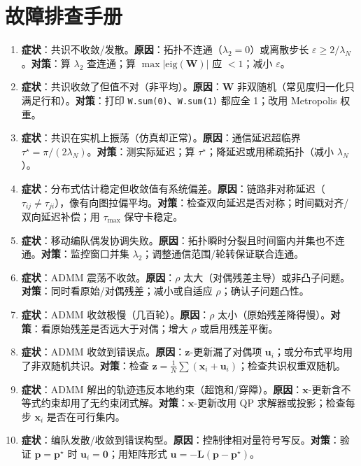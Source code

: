 \section*{故障排查手册}
\begin{enumerate}
  \item \textbf{症状}：共识不收敛/发散。\textbf{原因}：拓扑不连通（$\lambda_2=0$）或离散步长 $\varepsilon\ge2/\lambda_N$。\textbf{对策}：算 $\lambda_2$ 查连通；算 $\max|\mathrm{eig}(\mathbf{W})|$ 应 $<1$；减小 $\varepsilon$。
  \item \textbf{症状}：共识收敛了但值不对（非平均）。\textbf{原因}：$\mathbf{W}$ 非双随机（常见度归一化只满足行和）。\textbf{对策}：打印 \verb|W.sum(0)|、\verb|W.sum(1)| 都应全 1；改用 Metropolis 权重。
  \item \textbf{症状}：共识在实机上振荡（仿真却正常）。\textbf{原因}：通信延迟超临界 $\tau^\star=\pi/(2\lambda_N)$。\textbf{对策}：测实际延迟；算 $\tau^\star$；降延迟或用稀疏拓扑（减小 $\lambda_N$）。
  \item \textbf{症状}：分布式估计稳定但收敛值有系统偏差。\textbf{原因}：链路非对称延迟（$\tau_{ij}\ne\tau_{ji}$），像有向图拉偏平均。\textbf{对策}：检查双向延迟是否对称；时间戳对齐/双向延迟补偿；用 $\tau_{\max}$ 保守卡稳定。
  \item \textbf{症状}：移动编队偶发协调失败。\textbf{原因}：拓扑瞬时分裂且时间窗内并集也不连通。\textbf{对策}：监控窗口并集 $\lambda_2$；调整通信范围/轮转保证联合连通。
  \item \textbf{症状}：ADMM 震荡不收敛。\textbf{原因}：$\rho$ 太大（对偶残差主导）或非凸子问题。\textbf{对策}：同时看原始/对偶残差；减小或自适应 $\rho$；确认子问题凸性。
  \item \textbf{症状}：ADMM 收敛极慢（几百轮）。\textbf{原因}：$\rho$ 太小（原始残差降得慢）。\textbf{对策}：看原始残差是否远大于对偶；增大 $\rho$ 或启用残差平衡。
  \item \textbf{症状}：ADMM 收敛到错误点。\textbf{原因}：$\mathbf{z}$-更新漏了对偶项 $\mathbf{u}_i$；或分布式平均用了非双随机共识。\textbf{对策}：检查 $\mathbf{z}=\tfrac1N\sum(\mathbf{x}_i+\mathbf{u}_i)$；检查共识权重双随机。
  \item \textbf{症状}：ADMM 解出的轨迹违反本地约束（超饱和/穿障）。\textbf{原因}：$\mathbf{x}$-更新含不等式约束却用了无约束闭式解。\textbf{对策}：$\mathbf{x}$-更新改用 QP 求解器或投影；检查每步 $\mathbf{x}_i$ 是否在可行集内。
  \item \textbf{症状}：编队发散/收敛到错误构型。\textbf{原因}：控制律相对量符号写反。\textbf{对策}：验证 $\mathbf{p}=\mathbf{p}^\star$ 时 $\mathbf{u}_i=\mathbf{0}$；用矩阵形式 $\mathbf{u}=-\mathbf{L}(\mathbf{p}-\mathbf{p}^\star)$。

\end{enumerate}
